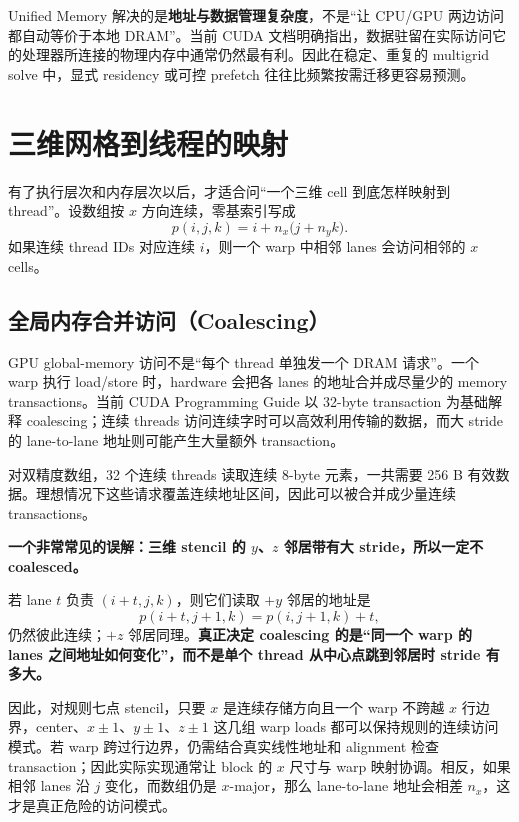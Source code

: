 Unified Memory 解决的是\textbf{地址与数据管理复杂度}，不是“让 CPU/GPU 两边访问都自动等价于本地 DRAM”。当前 CUDA 文档明确指出，数据驻留在实际访问它的处理器所连接的物理内存中通常仍然最有利\cite{cudaProgramming2026}。因此在稳定、重复的 multigrid solve 中，显式 residency 或可控 prefetch 往往比频繁按需迁移更容易预测。

\section{三维网格到线程的映射}
\label{sec:gpu-grid-mapping}

有了执行层次和内存层次以后，才适合问“一个三维 cell 到底怎样映射到 thread”。设数组按 $x$ 方向连续，零基索引写成
\begin{equation}
p(i,j,k)=i+n_x\bigl(j+n_y k\bigr).
\label{eq:gpu-linear-index}
\end{equation}
如果连续 thread IDs 对应连续 $i$，则一个 warp 中相邻 lanes 会访问相邻的 $x$ cells。

\subsection{全局内存合并访问（Coalescing）}

GPU global-memory 访问不是“每个 thread 单独发一个 DRAM 请求”。一个 warp 执行 load/store 时，hardware 会把各 lanes 的地址合并成尽量少的 memory transactions。当前 CUDA Programming Guide 以 32-byte transaction 为基础解释 coalescing；连续 threads 访问连续字时可以高效利用传输的数据，而大 stride 的 lane-to-lane 地址则可能产生大量额外 transaction\cite{cudaProgramming2026}。

对双精度数组，32 个连续 threads 读取连续 8-byte 元素，一共需要 256 B 有效数据。理想情况下这些请求覆盖连续地址区间，因此可以被合并成少量连续 transactions。

\begin{keybox}
\textbf{一个非常常见的误解：三维 stencil 的 $y$、$z$ 邻居带有大 stride，所以一定不 coalesced。}

若 lane $t$ 负责 $(i+t,j,k)$，则它们读取 $+y$ 邻居的地址是
\[
p(i+t,j+1,k)=p(i,j+1,k)+t,
\]
仍然彼此连续；$+z$ 邻居同理。\textbf{真正决定 coalescing 的是“同一个 warp 的 lanes 之间地址如何变化”，而不是单个 thread 从中心点跳到邻居时 stride 有多大。}
\end{keybox}

因此，对规则七点 stencil，只要 $x$ 是连续存储方向且一个 warp 不跨越 $x$ 行边界，center、$x\pm1$、$y\pm1$、$z\pm1$ 这几组 warp loads 都可以保持规则的连续访问模式。若 warp 跨过行边界，仍需结合真实线性地址和 alignment 检查 transaction；因此实际实现通常让 block 的 $x$ 尺寸与 warp 映射协调。相反，如果相邻 lanes 沿 $j$ 变化，而数组仍是 $x$-major，那么 lane-to-lane 地址会相差 $n_x$，这才是真正危险的访问模式。

